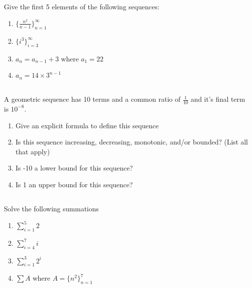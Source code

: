 \documentclass[twocolumn]{article}
\begin{document}
\subsection{}

    Give the first 5 elements of the following sequences:

    \begin{enumerate}
        \item $ \{ \frac{n^2}{n-1} \}^\infty_{n=1} $
        \item $ \{ i^3 \}^\infty_{i=3} $
        \item $ a_n = a_{n-1} + 3 $ where $a_1 = 22$
        \item $ a_n = 14 \times 3^{n-1} $
    \end{enumerate}

\subsection{}

    A geometric sequence has 10 terms and a common ratio of $\frac{1}{10}$ and it's final term is ${10^{-8}}$.

    \begin{enumerate}
        \item Give an explicit formula to define this sequence
        \item Is this sequence increasing, decreasing, monotonic, and/or bounded? (List all that apply)
        \item Is -10 a lower bound for this sequence?
        \item Is 1 an upper bound for this sequence?
    \end{enumerate}

\subsection{}

    Solve the following summations

    \begin{enumerate}
        \item $ \sum_{i=1}^{5} 2 $
        \item $ \sum_{i=4}^{7} i $
        \item $ \sum_{i=1}^{3} 2^i $
        \item $ \sum A $ where $ A = \{ n^2 \}^{7}_{n=1} $
    \end{enumerate}

\subsection{}
\end{document}
